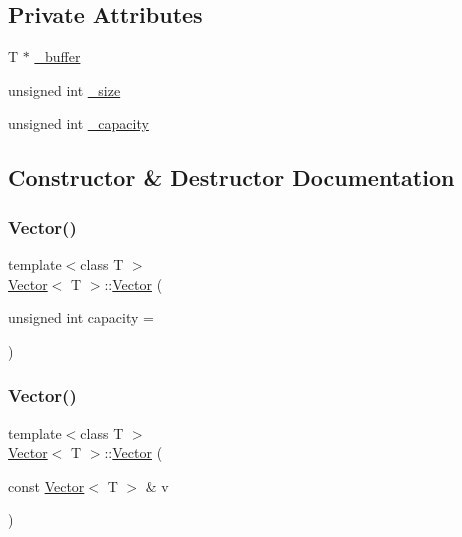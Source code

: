 \subsection*{Private Attributes}
\begin{DoxyCompactItemize}
\item 
T $\ast$ \hyperlink{classVector_a558d102b492fda3e325fddd1eb1b0266_a558d102b492fda3e325fddd1eb1b0266}{\+\_\+buffer}
\item 
unsigned int \hyperlink{classVector_acb6320b3ff4bf32733fbf0c279d8f895_acb6320b3ff4bf32733fbf0c279d8f895}{\+\_\+size}
\item 
unsigned int \hyperlink{classVector_a0c81b0e0d635e46bb65f05c6f12e08e8_a0c81b0e0d635e46bb65f05c6f12e08e8}{\+\_\+capacity}
\end{DoxyCompactItemize}


\subsection{Constructor \& Destructor Documentation}
\mbox{\label{classVector_aed1b9a621d7d2fc968e6e113fcda3f9a_aed1b9a621d7d2fc968e6e113fcda3f9a}} 
\subsubsection{\texorpdfstring{Vector()}{Vector()}\hspace{0.1cm}{\footnotesize\ttfamily [1/2]}}
{\footnotesize\ttfamily template$<$class T $>$ \\
\hyperlink{classVector}{Vector}$<$ T $>$\+::\hyperlink{classVector}{Vector} (\begin{DoxyParamCaption}\item[{unsigned int}]{capacity = {} }\end{DoxyParamCaption})}

\mbox{\label{classVector_a4edc1cac2c4cd6d3791280edabd89029_a4edc1cac2c4cd6d3791280edabd89029}} 
\subsubsection{\texorpdfstring{Vector()}{Vector()}\hspace{0.1cm}{\footnotesize\ttfamily [2/2]}}
{\footnotesize\ttfamily template$<$class T $>$ \\
\hyperlink{classVector}{Vector}$<$ T $>$\+::\hyperlink{classVector}{Vector} (\begin{DoxyParamCaption}\item[{const \hyperlink{classVector}{Vector}$<$ T $>$ \&}]{v }\end{DoxyParamCaption})}

